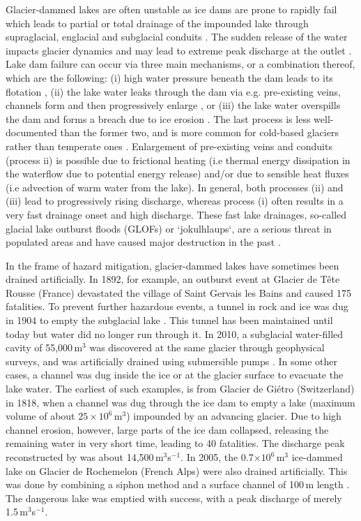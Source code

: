 Glacier-dammed lakes are often unstable as ice dams are prone to rapidly fail which leads to partial or total drainage of the impounded lake through supraglacial, englacial and subglacial conduits \citep{Roberts2005}. The sudden release of the water impacts glacier dynamics \citep{Roethlisberger1972} and may lead to extreme peak discharge at the outlet \citep{Bjoernsson1992}. Lake dam failure can occur via three main mechanisms, or a combination thereof, which are the following: (i) high water pressure beneath the dam leads to its flotation \citep{Bjornsson2010}, (ii) the lake water leaks through the dam via e.g. pre-existing veins, channels form and then progressively enlarge \citep{Nye1976}, or (iii) the lake water overspills the dam and forms a breach due to ice erosion \citep{Walder&Costa1996,Raymond&Nolan2000,Mayer&Schuler2005}. The last process is less well-documented than the former two, and is more common for cold-based glaciers rather than temperate ones \citep{Bjornsson2010}. Enlargement of pre-existing veins and conduits (process ii) is possible due to frictional heating (i.e thermal energy dissipation in the waterflow due to potential energy release) and/or due to sensible heat fluxes (i.e advection of warm water from the lake).
In general, both processes (ii) and (iii) lead to progressively rising discharge, whereas process (i) often results in a very fast drainage onset and high discharge. These fast lake drainages, so-called glacial lake outburst floods (GLOFs) or `jokulhlaups`, are a serious threat in populated areas and have caused major destruction in the past \citep[e.g.][]{Haeberli1983,Richardson&Reynolds2000,Bjoernsson2002, Ancey&al2019}.

In the frame of hazard mitigation, glacier-dammed lakes have sometimes been drained artificially. In 1892, for example, an outburst event at Glacier de Tête Rousse (France) devastated the village of Saint Gervais les Bains and caused 175 fatalities. To prevent further hazardous events, a tunnel in rock and ice was dug in 1904 to empty the subglacial lake \citep{Vincent&al2010b}. This tunnel has been maintained until today but water did no longer run through it. In 2010, a subglacial water-filled cavity of 55,000\,m$^3$ was discovered at the same glacier through geophysical surveys, and was artificially drained using submersible pumps \citep{Vincent&al2012}. In some other cases, a channel was dug inside the ice or at the glacier surface to evacuate the lake water. The earliest of such examples, is from Glacier de Gi\'etro (Switzerland) in 1818, when a channel was dug through the ice dam to empty a lake (maximum volume of about $25\times10^6$\,m$^3$) impounded by an advancing glacier. Due to high channel erosion, however, large parts of the ice dam collapsed, releasing the remaining water in very short time, leading to 40 fatalities. The discharge peak reconstructed by \cite{Ancey&al2019} was about 14,500\,m$^3$s$^{-1}$. In 2005, the 0.7$\times10^6$\,m$^3$ ice-dammed lake on Glacier de Rochemelon (French Alps) were also drained artificially. This was done by combining a siphon method and a surface channel of 100\,m length \citep{Vincent&al2010}. The dangerous lake was emptied with success, with a peak discharge of merely 1.5\,m$^3$s$^{-1}$.

